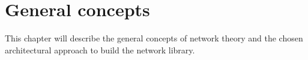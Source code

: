 \chapter{General concepts}\label{chap:general}
This chapter will describe the general concepts of network theory and the chosen architectural approach to build the network library.


